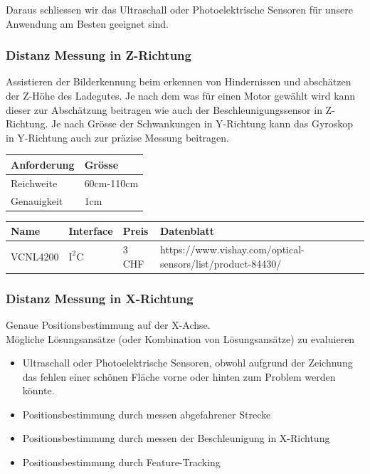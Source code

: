 \documentclass[a4paper]{report}
\begin{document}
Daraus schliessen wir das Ultraschall oder Photoelektrische
Sensoren für unsere Anwendung am Besten geeignet sind.

\subsubsection{Distanz Messung in Z-Richtung}
Assistieren der Bilderkennung beim erkennen von Hindernissen und
abschätzen der Z-Höhe des Ladegutes. Je nach dem was für einen Motor gewählt
wird kann dieser zur Abschätzung beitragen wie auch der Beschleunigungssensor
in Z-Richtung. Je nach Grösse der Schwankungen in Y-Richtung kann das Gyroskop
in Y-Richtung auch zur präzise Messung beitragen.

\vspace{1em}
\noindent
\begin{tabular}{|p{}|p{}|}
  \hline
  \textbf{Anforderung} & \textbf{Grösse} \\
  \hline
  Reichweite & 60cm-110cm \\
  \hline
  Genauigkeit & 1cm \\
  \hline
\end{tabular}

\vspace{1em}
\noindent
\begin{tabular}{|p{}|p{}|p{}|p{}|}
  \hline
  \textbf{Name} & \textbf{Interface} & \textbf{Preis} & \textbf{Datenblatt} \\
  \hline
  VCNL4200 & $\text{I}^2\text{C}$ & 3 CHF & https://www.vishay.com/optical-sensors/list/product-84430/ \\
  \hline
\end{tabular}

\subsubsection{Distanz Messung in X-Richtung}
Genaue Positionsbestimmung auf der X-Achse.\\
Mögliche Lösungsansätze (oder Kombination von Lösungsansätze) zu
evaluieren
\begin{itemize}
\item Ultraschall oder Photoelektrische Sensoren, obwohl aufgrund der Zeichnung
  das fehlen einer schönen Fläche vorne oder hinten zum Problem werden könnte.
\item Positionsbestimmung durch messen abgefahrener Strecke
\item Positionsbestimmung durch messen der Beschleunigung in X-Richtung
\item Positionsbestimmung durch Feature-Tracking
\end{itemize}
\end{document}
